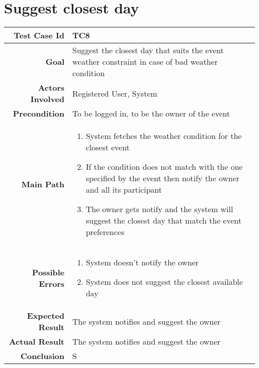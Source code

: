 \section{Suggest closest day}
\begin{tabularx}{\linewidth}{|r|X|X|}
\hline   {\bf Test Case Id} &  TC8\\
  \hline  {\bf Goal} & Suggest the closest day that suits the event weather constraint in case of bad weather condition\\
  \hline  {\bf Actors Involved} & Registered User, System\\
  \hline  {\bf Precondition} & To be logged in, to be the owner of the event\\ 
   \hline  {\bf Main Path} & \begin{enumerate} 
   \item System fetches the weather condition for the closest event
    \item If the condition does not match with the one specified by the event then notify the owner and all its participant
    \item The owner gets notify and the system will suggest the closest day that match the event preferences
   \end{enumerate}\\
   \hline  {\bf Possible Errors} & \begin{enumerate} 
   \item System doesn't notify the owner
   \item System does not suggest the closest available day
   \end{enumerate}\\
  \hline  {\bf Expected Result} & The system notifies and suggest the owner\\
  \hline  {\bf Actual Result} & The system notifies and suggest the owner\\
  \hline  {\bf Conclusion} & S\\
  \hline
  
\end{tabularx}





